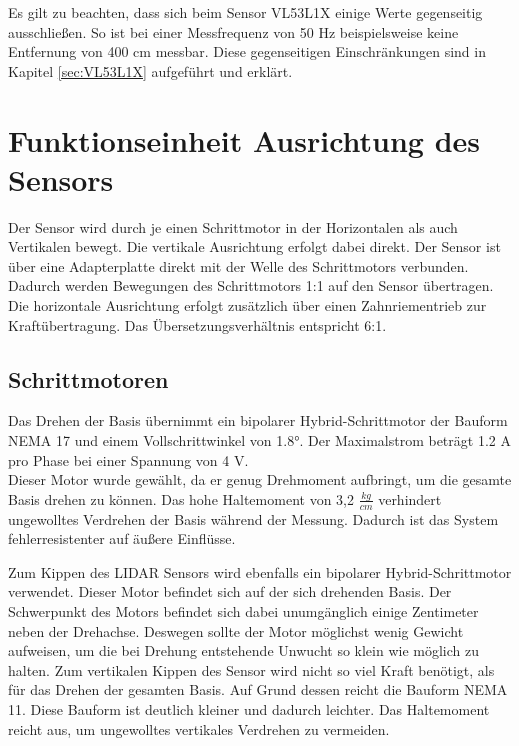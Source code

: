 Es gilt zu beachten, dass sich beim Sensor VL53L1X einige Werte gegenseitig ausschließen. So ist bei einer Messfrequenz von 50 Hz beispielsweise keine Entfernung von 400 cm messbar. Diese gegenseitigen Einschränkungen sind in Kapitel \ref{sec:VL53L1X} aufgeführt und erklärt.

 

\section{Funktionseinheit Ausrichtung des Sensors}

Der Sensor wird durch je einen Schrittmotor in der Horizontalen als auch Vertikalen bewegt. Die vertikale Ausrichtung erfolgt dabei direkt. Der Sensor ist über eine Adapterplatte direkt mit der Welle des Schrittmotors verbunden. Dadurch werden Bewegungen des Schrittmotors 1:1 auf den Sensor übertragen.\\ 
Die horizontale Ausrichtung erfolgt zusätzlich über einen Zahnriementrieb zur Kraftübertragung. Das Übersetzungsverhältnis entspricht 6:1.  

\subsection{Schrittmotoren}
Das Drehen der Basis übernimmt ein bipolarer Hybrid-Schrittmotor der Bauform \ac{NEMA} 17 und einem Vollschrittwinkel von 1.8°. Der Maximalstrom beträgt 1.2 A pro Phase bei einer Spannung von 4 V.\\ 
Dieser Motor wurde gewählt, da er genug Drehmoment aufbringt, um die gesamte Basis drehen zu können. Das hohe Haltemoment von 3,2 $\frac{kg}{cm}$ verhindert ungewolltes Verdrehen der Basis während der Messung. Dadurch ist das System fehlerresistenter auf äußere Einflüsse. \cite{NEMA17} 


Zum Kippen des \ac{LIDAR} Sensors wird ebenfalls ein bipolarer Hybrid-Schrittmotor verwendet. Dieser Motor befindet sich auf der sich drehenden Basis. Der Schwerpunkt des Motors befindet sich dabei unumgänglich einige Zentimeter neben der Drehachse. Deswegen sollte der Motor möglichst wenig Gewicht aufweisen, um die bei Drehung entstehende Unwucht so klein wie möglich zu halten.
Zum vertikalen Kippen des Sensor wird nicht so viel Kraft benötigt, als für das Drehen der gesamten Basis. Auf Grund dessen reicht die Bauform \ac{NEMA} 11. Diese Bauform ist deutlich kleiner und dadurch leichter.
Das Haltemoment reicht aus, um ungewolltes vertikales Verdrehen zu vermeiden.


